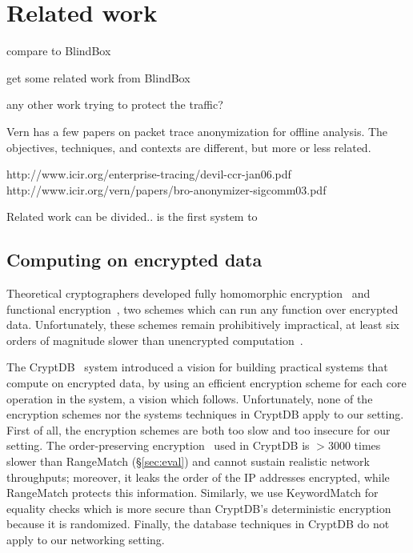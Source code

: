 
\section{Related work}\label{sec:related}

compare to BlindBox

get some related work from BlindBox

any other work trying to protect the traffic? 

Vern has a few papers on packet trace anonymization for offline analysis. The objectives, techniques, and contexts are different, but more or less related.

http://www.icir.org/enterprise-tracing/devil-ccr-jan06.pdf
http://www.icir.org/vern/papers/bro-anonymizer-sigcomm03.pdf

Related work can be divided..
\sys is the first system to 

\subsection{Computing on encrypted data}

 Theoretical cryptographers developed fully homomorphic encryption~\cite{gentry:fhe, gentry:fhe-aes-eprint} and functional encryption~\cite{BSW11}, two schemes which can run any function over encrypted data. Unfortunately, these schemes remain prohibitively impractical, at least six orders of magnitude slower than unencrypted computation~\cite{gentry:fhe-aes-eprint}.

 The CryptDB~\cite{popa:cryptdb} system introduced a vision for building practical systems that compute on encrypted data, by using an efficient encryption scheme for each core operation in the system, a vision which \sys follows. Unfortunately, none of the encryption schemes nor the systems techniques in CryptDB apply to our setting. First of all, the encryption schemes are both too slow and too insecure for our setting. The order-preserving encryption~\cite{boldyreva:ope} used in CryptDB is 
 $>3000$ times slower than RangeMatch (\S\ref{sec:eval}) and cannot sustain realistic network throughputs; moreover, it leaks the order of the IP addresses encrypted, while RangeMatch protects this information. Similarly, we use KeywordMatch for equality checks which is more secure than CryptDB's deterministic encryption because it is randomized. Finally, the database techniques in CryptDB do not apply to our networking setting. 

